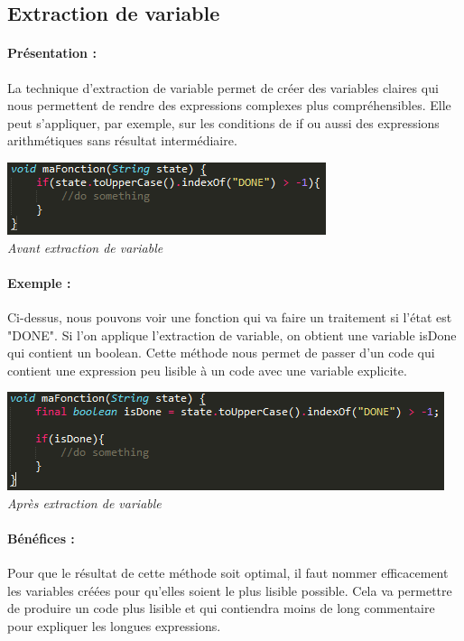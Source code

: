 \documentclass[a4paper,twoside,12pt,openright]{report}
\begin{document}
\subsection{Extraction de variable}
\paragraph{Présentation :}
La technique d'extraction de variable permet de créer des variables claires qui nous permettent de rendre des expressions complexes plus compréhensibles.
Elle peut s'appliquer, par exemple, sur les conditions de if ou aussi des expressions arithmétiques sans résultat intermédiaire.

\begin{center}
\includegraphics[scale=1]{Image/Extraction_Variable.png}\\
\itshape{Avant extraction de variable}
\end{center}

\paragraph{Exemple :}
Ci-dessus, nous pouvons voir une fonction qui va faire un traitement si l'état est "DONE".
Si l'on applique l'extraction de variable, on obtient une variable isDone qui contient un boolean. Cette méthode nous permet de passer d'un code qui contient une expression peu lisible à un code avec une variable explicite.

\begin{center}
\includegraphics[scale=1]{Image/Extraction_Variable2.png}\\
\itshape{Après extraction de variable}
\end{center}

\paragraph{Bénéfices :}
Pour que le résultat de cette méthode soit optimal, il faut nommer efficacement les variables créées pour  qu'elles soient le plus lisible possible. Cela va permettre de produire un code plus lisible et qui contiendra moins de long commentaire pour expliquer les longues expressions.
\end{document}
